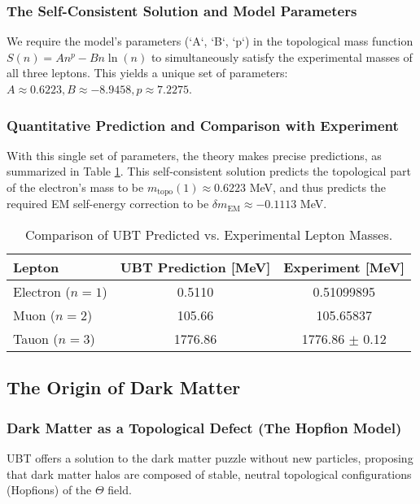 \documentclass[12pt, a4paper]{article}
\begin{document}
\subsubsection{The Self-Consistent Solution and Model Parameters}
We require the model's parameters (`A`, `B`, `p`) in the topological mass function \( S(n) = A n^p - B n \ln(n) \) to simultaneously satisfy the experimental masses of all three leptons. This yields a unique set of parameters: \( A \approx 0.6223, B \approx -8.9458, p \approx 7.2275 \).

\subsubsection{Quantitative Prediction and Comparison with Experiment}
With this single set of parameters, the theory makes precise predictions, as summarized in Table \ref{tab:masses}. This self-consistent solution predicts the topological part of the electron's mass to be \(m_{\text{topo}}(1) \approx 0.6223\) MeV, and thus predicts the required EM self-energy correction to be \( \delta m_{\text{EM}} \approx -0.1113 \) MeV.

\begin{table}[h!]
\centering
\caption{Comparison of UBT Predicted vs. Experimental Lepton Masses.}
\label{tab:masses}
\begin{tabular}{l|c|c}
\hline
\textbf{Lepton} & \textbf{UBT Prediction [MeV]} & \textbf{Experiment [MeV]} \\
\hline
Electron (\(n=1\)) & 0.5110 & 0.51099895 \\
Muon (\(n=2\)) & 105.66 & 105.65837 \\
Tauon (\(n=3\)) & 1776.86 & 1776.86 \(\pm\) 0.12 \\
\hline
\end{tabular}
\end{table}

\subsection{The Origin of Dark Matter}
\subsubsection{Dark Matter as a Topological Defect (The Hopfion Model)}
UBT offers a solution to the dark matter puzzle without new particles, proposing that dark matter halos are composed of stable, neutral topological configurations (Hopfions) of the \( \Theta \) field.
\end{document}
